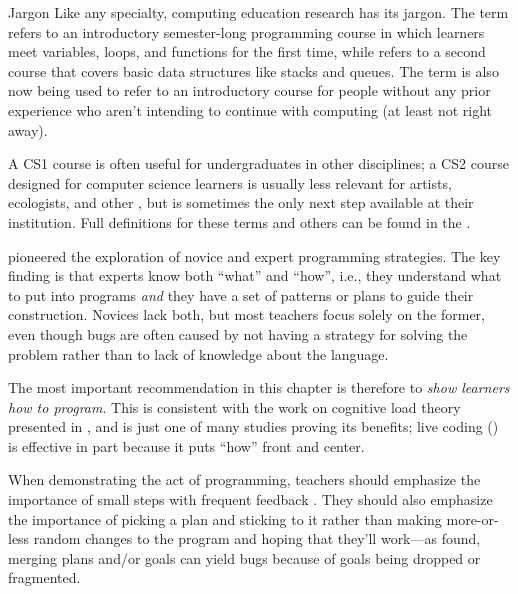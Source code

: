 \begin{aside}{Jargon}
  Like any specialty, computing education research has its jargon. The
  term  refers to an introductory semester-long
  programming course in which learners meet variables, loops, and
  functions for the first time, while  refers to
  a second course that covers basic data structures like stacks and
  queues. The term  is also now being used to
  refer to an introductory course for people without any prior
  experience who aren't intending to continue with computing (at least
  not right away).

  A CS1 course is often useful for undergraduates in other
  disciplines; a CS2 course designed for computer science learners is
  usually less relevant for artists, ecologists, and other , but is sometimes the only next
  step available at their institution. Full definitions for these
  terms and others can be found in the .
\end{aside}


\cite{Solo1984,Solo1986} pioneered the exploration of novice and
expert programming strategies. The key finding is that experts know both
``what'' and ``how'', i.e., they understand what to put into programs \emph{and}
they have a set of patterns or plans to guide their construction.
Novices lack both, but most teachers focus solely on the former, even
though bugs are often caused by not having a strategy for solving the
problem rather than to lack of knowledge about the language.

The most important recommendation in this chapter is therefore to \emph{show
learners how to program}. This is consistent with the work on cognitive
load theory presented in , and \cite{Mull2007b} is
just one of many studies proving its benefits; live coding
() is effective in part because it puts
``how'' front and center.

When demonstrating the act of programming, teachers should emphasize the
importance of small steps with frequent feedback \cite{Blik2014}.
They should also emphasize the importance of picking a plan and sticking
to it rather than making more-or-less random changes to the program and
hoping that they'll work---as \cite{Spoh1985} found, merging plans
and/or goals can yield bugs because of goals being dropped or
fragmented.

